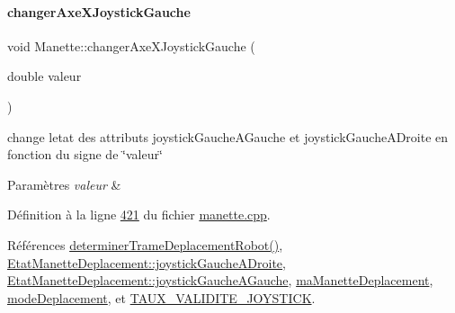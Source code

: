 \paragraph{\texorpdfstring{changer\+Axe\+X\+Joystick\+Gauche}{changerAxeXJoystickGauche}}
{\footnotesize\ttfamily void Manette\+::changer\+Axe\+X\+Joystick\+Gauche (\begin{DoxyParamCaption}\item[{double}]{valeur }\end{DoxyParamCaption})\hspace{0.3cm}{\ttfamily [slot]}}



change l\textquotesingle{}etat des attributs joystick\+Gauche\+A\+Gauche et joystick\+Gauche\+A\+Droite en fonction du signe de \char`\"{}valeur\char`\"{} 


\begin{DoxyParams}{Paramètres}
{\em valeur} & \\
\hline
\end{DoxyParams}


Définition à la ligne \hyperlink{manette_8cpp_source_l00421}{421} du fichier \hyperlink{manette_8cpp_source}{manette.\+cpp}.



Références \hyperlink{manette_8cpp_source_l00341}{determiner\+Trame\+Deplacement\+Robot()}, \hyperlink{manette_8h_source_l00183}{Etat\+Manette\+Deplacement\+::joystick\+Gauche\+A\+Droite}, \hyperlink{manette_8h_source_l00182}{Etat\+Manette\+Deplacement\+::joystick\+Gauche\+A\+Gauche}, \hyperlink{manette_8h_source_l00220}{ma\+Manette\+Deplacement}, \hyperlink{manette_8h_source_l00253}{mode\+Deplacement}, et \hyperlink{manette_8h_source_l00020}{T\+A\+U\+X\+\_\+\+V\+A\+L\+I\+D\+I\+T\+E\+\_\+\+J\+O\+Y\+S\+T\+I\+CK}.


